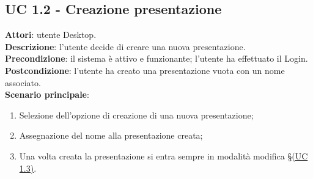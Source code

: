\subsection{UC 1.2 - Creazione presentazione}{
	\label{uc1.2}
	\textbf{Attori}: utente Desktop.	\\
	\textbf{Descrizione}: l'utente decide di creare una nuova presentazione.	\\
	\textbf{Precondizione}: il sistema è attivo e funzionante; l'utente ha effettuato il Login.	\\
	\textbf{Postcondizione}: l'utente ha creato una presentazione vuota con un nome associato.	\\
	\textbf{Scenario principale}:
	\begin{enumerate}
		\item Selezione dell'opzione di creazione di una nuova presentazione;
		\item Assegnazione del nome alla presentazione creata;
		\item Una volta creata la presentazione si entra sempre in modalità modifica \S\hyperref[uc1.3]{(UC 1.3)}.
	\end{enumerate}
	}